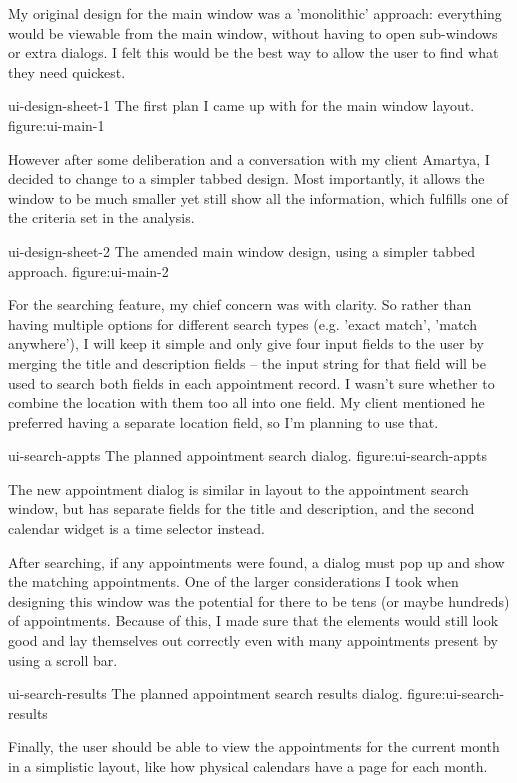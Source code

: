 My original design for the main window was a 'monolithic' approach: everything
would be viewable from the main window, without having to open sub-windows or
extra dialogs. I felt this would be the best way to allow the user to find what
they need quickest.

\addfigure
    {ui-design-sheet-1}
    {The first plan I came up with for the main window layout.}
    {figure:ui-main-1}

However after some deliberation and a conversation with my client Amartya, I
decided to change to a simpler tabbed design. Most importantly, it allows the
window to be much smaller yet still show all the information, which fulfills one
of the criteria set in the analysis.

\addfigure
    {ui-design-sheet-2}
    {The amended main window design, using a simpler tabbed approach.}
    {figure:ui-main-2}

For the searching feature, my chief concern was with clarity. So rather than
having multiple options for different search types (e.g. 'exact match', 'match
anywhere'), I will keep it simple and only give four input fields to the user by
merging the title and description fields -- the input string for that field will
be used to search both fields in each appointment record. I wasn't sure whether
to combine the location with them too all into one field. My client mentioned he
preferred having a separate location field, so I'm planning to use that.

\addfigure
    {ui-search-appts}
    {The planned appointment search dialog.}
    {figure:ui-search-appts}

The new appointment dialog is similar in layout to the appointment search
window, but has separate fields for the title and description, and the second
calendar widget is a time selector instead.

After searching, if any appointments were found, a dialog must pop up and show
the matching appointments. One of the larger considerations I took when
designing this window was the potential for there to be tens (or maybe hundreds)
of appointments. Because of this, I made sure that the elements would still look
good and lay themselves out correctly even with many appointments present by
using a scroll bar.

\addfigure
    {ui-search-results}
    {The planned appointment search results dialog.}
    {figure:ui-search-results}

Finally, the user should be able to view the appointments for the current month
in a simplistic layout, like how physical calendars have a page for each month.

